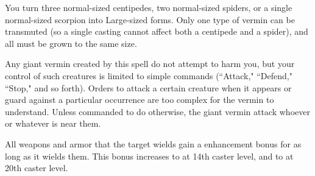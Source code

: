 \begin{spellheader}
\end{spellheader}
\begin{spellcontent}
    \begin{spelltargetinginfo}
    \end{spelltargetinginfo}
    \begin{spelleffects}
        \spelleffect You turn three normal-sized centipedes, two normal-sized spiders, or a single normal-sized scorpion into Large-sized forms. Only one type of vermin can be transmuted (so a single casting cannot affect both a centipede and a spider), and all must be grown to the same size.
        \par Any giant vermin created by this spell do not attempt to harm you, but your control of such creatures is limited to simple commands (``Attack," ``Defend," ``Stop," and so forth). Orders to attack a certain creature when it appears or guard against a particular occurrence are too complex for the vermin to understand. Unless commanded to do otherwise, the giant vermin attack whoever or whatever is near them.
        \spelldur \durmed
    \end{spelleffects}
\end{spellcontent}
\begin{spellfooter}
\end{spellfooter}

\begin{spellheader}
\end{spellheader}
\begin{spellcontent}
    \begin{spelltargetinginfo}
    \end{spelltargetinginfo}
    \begin{spelleffects}
        \spelleffect All weapons and armor that the target wields gain a  enhancement bonus for as long as it wields them. This bonus increases to  at 14th caster level, and to  at 20th caster level.
        \spelldur \durshort
    \end{spelleffects}
\end{spellcontent}
\begin{spellfooter}
\end{spellfooter}



